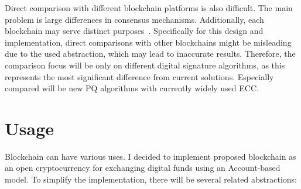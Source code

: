Direct comparison with different blockchain platforms is also difficult. The main problem is large differences in consensus mechanisms. Additionally, each blockchain may serve distinct purposes~\cite{BC.performance.eval}. Specifically for this design and implementation, direct comparisons with other blockchains might be misleading due to the used abstraction, which may lead to inaccurate results. Therefore, the comparison focus will be only on different digital signature algorithms, as this represents the most significant difference from current solutions. Especially compared will be new PQ algorithms with currently widely used ECC.



\section{Usage}
\label{sec:design.usage}

Blockchain can have various uses. I decided to implement proposed blockchain as an open cryptocurrency for exchanging digital funds using an Account-based model. To simplify the implementation, there will be several related abstractions:

